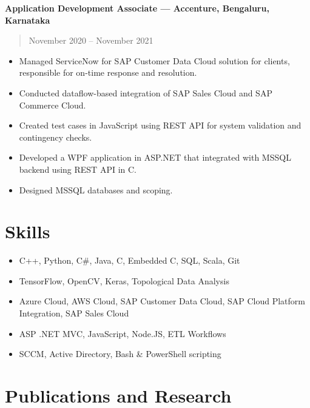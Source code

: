 \documentclass[]{article}
\begin{document}
	\textbf{Application Development Associate --- Accenture, Bengaluru, Karnataka}
	\begin{quote}
		November 2020 -- November 2021
	\end{quote}
	\begin{itemize}
		\item Managed ServiceNow for SAP Customer Data Cloud solution for clients, responsible for on-time response and resolution.
		\item Conducted dataflow-based integration of SAP Sales Cloud and SAP Commerce Cloud.
		\item Created test cases in JavaScript using REST API for system validation and contingency checks.
		\item Developed a WPF application in ASP.NET that integrated with MSSQL backend using REST API in C.
		\item Designed MSSQL databases and scoping.
	\end{itemize}

	\section*{Skills}

	\begin{itemize}
		\item C++, Python, C\#, Java, C, Embedded C, SQL, Scala, Git
		\item TensorFlow, OpenCV, Keras, Topological Data Analysis
		\item Azure Cloud, AWS Cloud, SAP Customer Data Cloud, SAP Cloud Platform Integration, SAP Sales Cloud
		\item ASP .NET MVC, JavaScript, Node.JS, ETL Workflows
		\item SCCM, Active Directory, Bash \& PowerShell scripting
	\end{itemize}

	\section*{Publications and Research}
\end{document}
